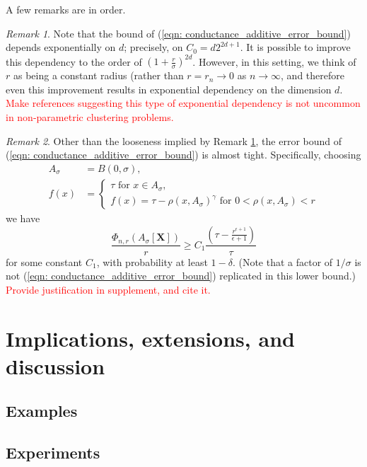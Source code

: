 \documentclass{article}
\newcommand{\Asig}{A_{\sigma}}
\theoremstyle{aldenthm}
\theoremstyle{remark}
\newtheorem{remark}{Remark}
\begin{document}
A few remarks are in order. 
\begin{remark}
	\label{rem: exp_in_d}
	Note that the bound of (\ref{eqn: conductance_additive_error_bound}) depends exponentially on $d$; precisely, on $C_0 = d2^{2d +1}$. It is possible to improve this dependency to the order of $(1 + \frac{r}{\sigma})^{2d}$. However, in this setting, we think of $r$ as being a constant radius (rather than $r = r_n \to 0$ as $n \to \infty$, and therefore even this improvement results in exponential dependency on the dimension $d$. \textcolor{red}{Make references suggesting this type of exponential dependency is not uncommon in non-parametric clustering problems.}
\end{remark}
\begin{remark}
	Other than the looseness implied by Remark \ref{rem: exp_in_d}, the error bound of (\ref{eqn: conductance_additive_error_bound}) is almost tight. Specifically, choosing
	\begin{align*}
	\Asig & = B(0,\sigma), \\
	 f(x) & = 
	 \begin{cases}
	 \tau \text{ for $x \in \Asig$}, \\
	  f(x) = \tau - \rho(x,\Asig)^{\gamma} \text{ for $0 < \rho(x,\Asig) < r$}
	 \end{cases}
	\end{align*}
	we have
	\begin{equation}
	\frac{\Phi_{n,r}(\Asig[\mathbf{X}])}{r} \geq C_1 \frac{(\tau - \frac{r^{\epsilon+1}}{\epsilon+1})}{\tau}
	\end{equation}
	for some constant $C_1$, with probability at least $1 - \delta$. (Note that a factor of $1 / \sigma$ is not (\ref{eqn: conductance_additive_error_bound}) replicated in this lower bound.) \textcolor{red}{Provide justification in supplement, and cite it.}
\end{remark}

\section{Implications, extensions, and discussion}
\label{section: everything_else}
\subsection{Examples}
\subsection{Experiments}

\clearpage



\end{document}
